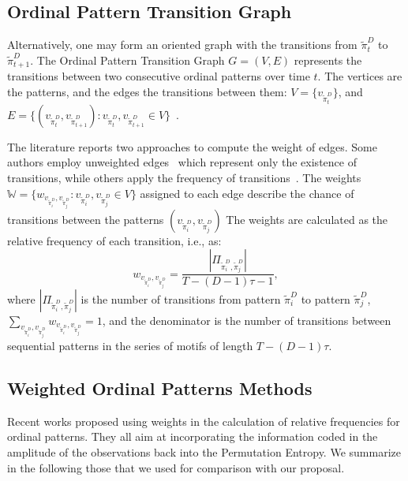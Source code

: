 \documentclass[journal]{IEEEtran}
\begin{document}
	\subsection{Ordinal Pattern Transition Graph}\label{OPTG}
	
	Alternatively, one may form an oriented graph with the transitions from $\widetilde\pi_t^D$ to $\widetilde\pi_{t+1}^D$. 
	The Ordinal Pattern Transition Graph ${G} = ({V}, {E})$ 
	represents the transitions between two consecutive ordinal patterns over time $t$.
	The vertices are the patterns, and the edges the transitions between them:
	$V = \{v_{\widetilde\pi_t^D}\}$, and 
	$E = \{(v_{\widetilde\pi_t^D}, v_{\widetilde\pi_{t+1}^D}): v_{\widetilde\pi_t^D}, v_{\widetilde\pi_{t+1}^D} \in V \}$~\cite{Borges2019Transition}.
	
	The literature reports two approaches to compute the weight of edges.
	Some authors employ unweighted edges~\cite{McCullough2015lagged,Kulp2016ordinal} which represent only the existence of transitions, while others apply the frequency of transitions~\cite{Sorrentino2015periodic,Zhang2017ConstructingOP}.
	The weights $\mathbb{W} = \{w_{v_{\widetilde{\pi}^D_i}, v_{\widetilde\pi^D_j}}: v_{\widetilde\pi^D_i}, v_{\widetilde\pi^D_j} \in V \}$ assigned to each edge describe the chance of transitions between the patterns $(v_{\widetilde\pi^D_i}, v_{\widetilde\pi^D_j})$
	The weights are calculated as the relative frequency of each transition, i.e., as:
	\begin{equation}
	w_{v_{\widetilde\pi^D_i}, v_{\widetilde\pi^D_j}} = \frac{|\Pi_{\widetilde\pi^D_i,\widetilde\pi^D_j}|}{T-(D-1)\tau-1},
	\end{equation}
	where $|\Pi_{\widetilde\pi^D_i,\widetilde\pi^D_j}|$ is the number of transitions from pattern $\widetilde\pi^D_i$ to pattern $\widetilde\pi^D_j$, $\sum_{v_{\widetilde\pi^D_i}, v_{\widetilde\pi^D_j}}w_{v_{\widetilde\pi^D_i}, v_{\widetilde\pi^D_j}} = 1$,
	and the denominator is the number of transitions between sequential patterns in the series of motifs of length $T-(D-1)\tau$.
	
	\subsection{Weighted Ordinal Patterns Methods}\label{Methods}
	
	Recent works proposed using weights in the calculation of relative frequencies for ordinal patterns.
	They all aim at incorporating the information coded in the amplitude of the observations back into the Permutation Entropy.
	We summarize in the following those that we used for comparison with our proposal.
	
\end{document}
